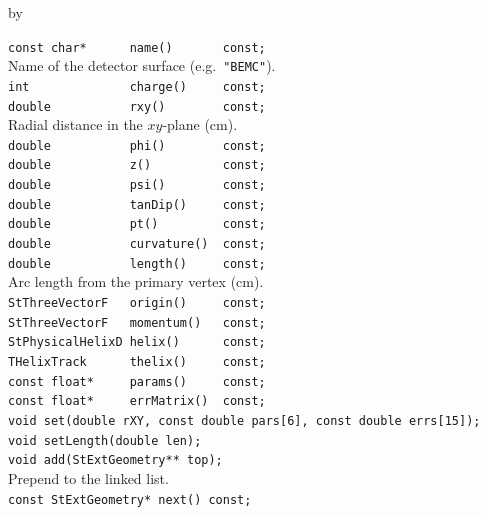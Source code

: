 \documentclass[twoside]{article}
\newcommand{\entrylabel}[1]{\mbox{\textbf{{#1}}}\hfil}%
\newenvironment{entry}
{\begin{list}{}%
    {\renewcommand{\makelabel}{\entrylabel}%
     \setlength{\labelwidth}{90pt}%
     \setlength{\leftmargin}{\labelwidth}
     \advance\leftmargin by \labelsep%
      }%
    }%
  {\end{list}}
\newcommand{\Entrylabel}[1]%
{\raisebox{0pt}[1ex][0pt]{\makebox[\labelwidth][l]%
    {\parbox[t]{\labelwidth}{\hspace{0pt}\textbf{{#1}}}}}}
\newenvironment{Entry}%
{\renewcommand{\entrylabel}{\Entrylabel}\begin{entry}}%
  {\end{entry}}
\begin{document}
\begin{Entry}
\item[Public Member\\ Functions]
    \verb+const char*      name()       const;+\\
        Name of the detector surface (e.g.\ \verb+"BEMC"+).\\
    \verb+int              charge()     const;+\\
    \verb+double           rxy()        const;+\\
        Radial distance in the $xy$-plane (cm).\\
    \verb+double           phi()        const;+\\
    \verb+double           z()          const;+\\
    \verb+double           psi()        const;+\\
    \verb+double           tanDip()     const;+\\
    \verb+double           pt()         const;+\\
    \verb+double           curvature()  const;+\\
    \verb+double           length()     const;+\\
        Arc length from the primary vertex (cm).\\
    \verb+StThreeVectorF   origin()     const;+\\
    \verb+StThreeVectorF   momentum()   const;+\\
    \verb+StPhysicalHelixD helix()      const;+\\
    \verb+THelixTrack      thelix()     const;+\\
    \verb+const float*     params()     const;+\\
    \verb+const float*     errMatrix()  const;+\\
    \verb+void set(double rXY, const double pars[6], const double errs[15]);+\\
    \verb+void setLength(double len);+\\
    \verb+void add(StExtGeometry** top);+\\
        Prepend to the linked list.\\
    \verb+const StExtGeometry* next() const;+\\
\end{Entry}
\clearpage

\end{document}
